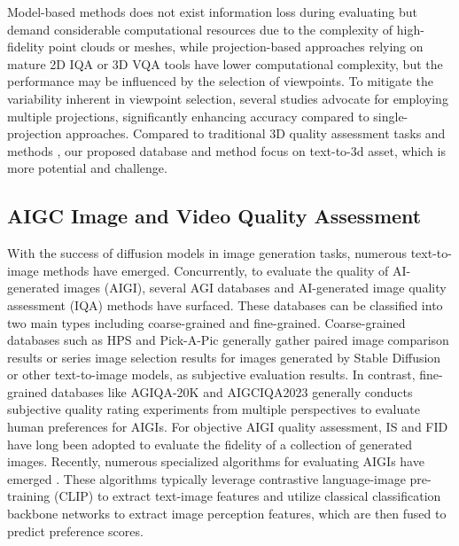 Model-based methods does not exist information loss during evaluating but demand considerable computational resources due to the complexity of high-fidelity point clouds or meshes, while projection-based approaches relying on mature 2D IQA or 3D VQA tools have lower computational complexity, but the performance may be influenced by the selection of viewpoints. To mitigate the variability inherent in viewpoint selection, several studies \cite{zhang2022treating, fan2022no} advocate for employing multiple projections, significantly enhancing accuracy compared to single-projection approaches. Compared to traditional 3D quality assessment tasks and methods \cite{zhang2022no, liu2021pqa, chai2024plain}, our proposed database and method focus on text-to-3d asset, which is more potential and challenge.

\vspace{-15pt}
\subsection{AIGC Image and Video Quality Assessment}
With the success of diffusion models in image generation tasks, numerous text-to-image methods have emerged. Concurrently, to evaluate the quality of AI-generated images (AIGI), several AGI databases and AI-generated image quality assessment (IQA) methods have surfaced. These databases can be classified into two main types including coarse-grained and fine-grained. Coarse-grained databases such as HPS\cite{wu2023human} and Pick-A-Pic \cite{kirstain2024pick} generally gather paired image comparison results or series image selection results for images generated by Stable Diffusion or other text-to-image models, as subjective evaluation results. In contrast, fine-grained databases like AGIQA-20K \cite{li2024aigiqa} and AIGCIQA2023 \cite{wang2023aigciqa2023} generally conducts subjective quality rating experiments from multiple perspectives to evaluate human preferences for AIGIs. For objective AIGI quality assessment, IS \cite{gulrajani2017improved} and FID \cite{heusel2017gans} have long been adopted to evaluate the fidelity of a collection of generated images. Recently, numerous specialized algorithms for evaluating AIGIs have emerged \cite{xu2024imagereward, wu2023human}. These algorithms typically leverage contrastive language-image pre-training (CLIP) \cite{radford2021learning} to extract text-image features and utilize classical classification backbone networks to extract image perception features\cite{wang2024understanding}, which are then fused to predict preference scores.

